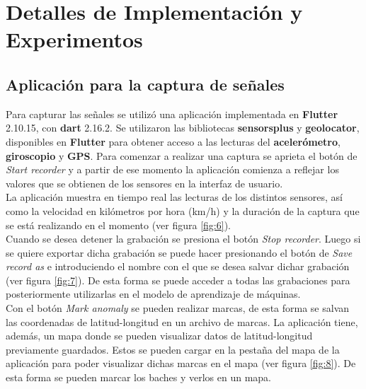 \chapter{Detalles de Implementación y Experimentos}\label{chapter:implementation}

\section{Aplicación para la captura de señales}
	Para capturar las señales se utilizó una aplicación implementada en \textbf{Flutter} 2.10.15, con \textbf{dart} 2.16.2.
	Se utilizaron las bibliotecas \textbf{sensors\textunderscore plus} y \textbf{geolocator}, disponibles en \textbf{Flutter} para obtener acceso
	a las lecturas del \textbf {acelerómetro}, \textbf{giroscopio} y \textbf{GPS}. Para comenzar a realizar una captura se aprieta el botón
	de \emph{Start recorder} y a partir de ese momento la aplicación comienza a reflejar los valores que se obtienen de los sensores en la
	interfaz de usuario.\\
	\indent La aplicación muestra en tiempo real las lecturas de los distintos sensores, así como la velocidad en kilómetros por hora (km/h) y la
	duración de la captura que se está realizando en el momento (ver figura \ref{fig:6}).\\
	\indent Cuando se desea detener la grabación se presiona el botón \emph{Stop recorder}. Luego si se quiere exportar dicha grabación se puede
	hacer presionando el botón de \emph{Save record as} e introduciendo el nombre con el que se desea salvar dichar grabación (ver figura
	\ref{fig:7}). De esta forma se puede acceder a todas las grabaciones para posteriormente utilizarlas en el modelo de aprendizaje de máquinas.\\
	\indent Con el botón \emph{Mark anomaly} se pueden realizar marcas, de esta forma se salvan las coordenadas de latitud-longitud en un
	archivo de marcas. La aplicación tiene, además, un mapa donde se pueden visualizar datos de latitud-longitud previamente guardados.
	Estos se pueden cargar en la pestaña del mapa de la aplicación para poder visualizar dichas marcas en el mapa (ver figura \ref{fig:8}).
	De esta forma se pueden marcar los baches y verlos en un mapa.\\
	

